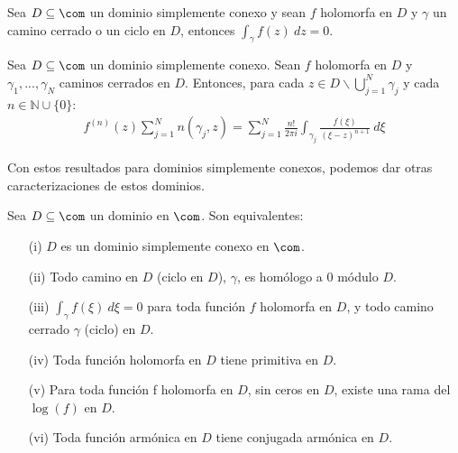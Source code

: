 \begin{teo}
Sea $D \subseteq \com$ un dominio simplemente conexo y sean $f$ holomorfa en $D$ y $\gamma$ un camino cerrado o un ciclo en $D$, entonces $\int_{\gamma} f(z) \ dz = 0$.
\end{teo}

\begin{teo}
Sea $D \subseteq \com$ un dominio simplemente conexo. Sean $f$ holomorfa en $D$ y $\gamma_1,...,\gamma_N$ caminos cerrados en $D$. Entonces, para cada $z \in D \backslash \bigcup_{j=1}^{N} \gamma_j$ y cada $n \in \mathbb{N} \cup \{0\}$:
\begin{align*}
    f^{(n)}(z) \sum_{j=1}^{N} n(\gamma_j,z) = \sum_{j=1}^{N} \frac{n!}{2\pi i} \int_{\gamma_j} \frac{f(\xi)}{(\xi -z)^{n+1}} \ d\xi
\end{align*}
\end{teo}

Con estos resultados para dominios simplemente conexos, podemos dar otras caracterizaciones de estos dominios.

\begin{teo}
Sea $D \subseteq \com$ un dominio en $\com$. Son equivalentes:
\begin{enumerate}
    \item[(i)] $D$ es un dominio simplemente conexo en $\com$.
    \item[(ii)] Todo camino en $D$ (ciclo en $D$), $\gamma$, es homólogo a 0 módulo $D$.
    \item[(iii)] $\int_{\gamma} f(\xi) \ d\xi = 0$ para toda función $f$ holomorfa en $D$, y todo camino cerrado $\gamma$ (ciclo) en $D$.
    \item[(iv)] Toda función holomorfa en $D$ tiene primitiva en $D$.
    \item[(v)] Para toda función f holomorfa en $D$, sin ceros en $D$, existe una rama del $\log(f)$ en $D$.
    \item[(vi)] Toda función armónica en $D$ tiene conjugada armónica en $D$.
\end{enumerate}
\end{teo}

